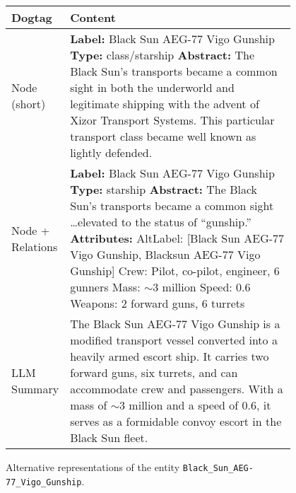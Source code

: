 \documentclass[11pt]{article}
\begin{document}
\begin{figure}[h]
\centering
\begin{tabular}{p{0.15\linewidth} p{0.8\linewidth}}
\toprule
\textbf{Dogtag} & \textbf{Content} \\
\midrule
Node (short) &
\textbf{Label:} Black Sun AEG-77 Vigo Gunship \newline
\textbf{Type:} class/starship \newline
\textbf{Abstract:} The Black Sun's transports became a common sight in both the underworld and legitimate shipping with the advent of Xizor Transport Systems. This particular transport class became well known as lightly defended. \\[0.5em]
\midrule
Node + Relations &
\textbf{Label:} Black Sun AEG-77 Vigo Gunship \newline
\textbf{Type:} starship \newline
\textbf{Abstract:} The Black Sun's transports became a common sight \dots elevated to the status of ``gunship.'' \newline
\textbf{Attributes:} \newline
\quad AltLabel: [Black Sun AEG-77 Vigo Gunship, Blacksun AEG-77 Vigo Gunship] \newline
\quad Crew: Pilot, co-pilot, engineer, 6 gunners \newline
\quad Mass: $\sim$3 million \newline
\quad Speed: 0.6 \newline
\quad Weapons: 2 forward guns, 6 turrets \\
\midrule
LLM Summary &
The Black Sun AEG-77 Vigo Gunship is a modified transport vessel converted into a heavily armed escort ship. It carries two forward guns, six turrets, and can accommodate crew and passengers. With a mass of $\sim$3 million and a speed of 0.6, it serves as a formidable convoy escort in the Black Sun fleet. \\
\bottomrule
\end{tabular}
\caption{Alternative representations of the entity \texttt{Black\_Sun\_AEG-77\_Vigo\_Gunship}.}
\end{figure}
\end{document}
